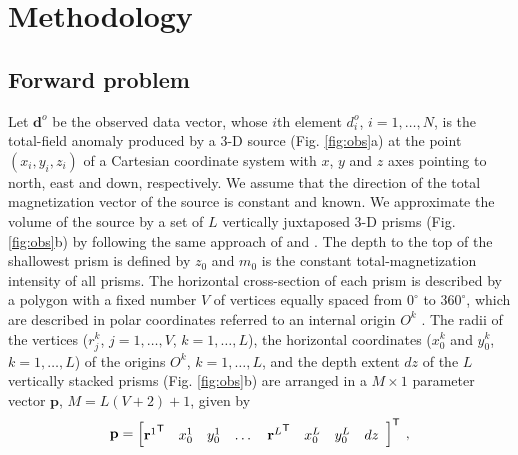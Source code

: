 \section{Methodology}\label{sec:metodo}

\subsection{Forward problem}

Let $\mathbf{d}^{o}$ be the observed data vector, whose $i$th element $d^{o}_{i}$, $i = 1, \dots, N$, is the total-field 
anomaly produced by a 3-D source (Fig. \ref{fig:obs}a) at the point $(x_{i}, y_{i}, z_{i})$ of a Cartesian coordinate 
system with $x$, $y$ and $z$ axes pointing to north, east and down, respectively. We assume that the direction of the 
total magnetization vector of the source is constant and known. 
We approximate the volume of the source by a set of $L$ vertically juxtaposed 3-D prisms 
(Fig. \ref{fig:obs}b) by following the same approach of \citet{oliveirajr-etal2011} and \citet{oliveirajr-barbosa2013}. 
The depth to the top of the shallowest prism is defined by $z_{0}$ and $m_{0}$ is the constant total-magnetization 
intensity of all prisms. 
The horizontal cross-section of each prism is described by a polygon with a fixed number 
$V$ of vertices equally spaced from $0^{\circ}$ to $360^{\circ}$, which are described in polar coordinates 
referred to an internal origin $O^{k}$ . 
The radii of the vertices ($r^{k}_{j}$, $j=1,\dots , V$, $k=1,\dots ,L$), the horizontal coordinates ($x_{0}^{k}$ and $y_{0}^{k}$, $k=1,\dots ,L$) 
of the origins $O^{k}$, $k=1,\dots ,L$, and the depth extent $dz$ of the $L$ vertically stacked prisms (Fig. \ref{fig:obs}b) are arranged in a 
$M \times 1$ parameter vector $\mathbf{p}$, $M = L (V + 2) + 1$, given by
\begin{equation}
\mathbf{p} = \left[ \begin{array}{@{}*{12}{c}@{}}
{\mathbf{r}^{1}}^{\mathsf{T}} & x_{0}^{1} & y_{0}^{1} & \dots & {\mathbf{r}^{L}}^{\mathsf{T}} & x_{0}^{L} & y_{0}^{L} & dz \\
\end{array} \right]^{\mathsf{T}} \: ,
\label{eq:p-vector}
\end{equation}
